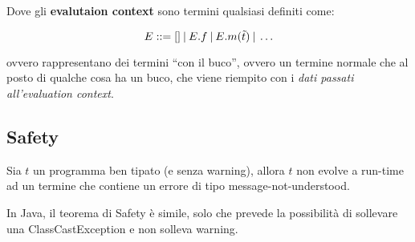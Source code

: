 Dove gli \textbf{evalutaion context} sono termini qualsiasi definiti come:

$$
E ::= [] \:|\: E.f \:|\: E.m(\tilde{t}) \:|\: \ldots
$$

ovvero rappresentano dei termini ``con il buco'', ovvero un termine normale che al posto di qualche cosa ha un buco, che viene riempito con i \textit{dati passati all'evaluation context}.


\subsection{Safety}

Sia $t$ un programma ben tipato (e senza warning), allora $t$ non evolve a run-time ad un termine che contiene un errore di tipo message-not-understood.

In Java, il teorema di Safety è simile, solo che prevede la possibilità di sollevare una ClassCastException e non solleva warning.






